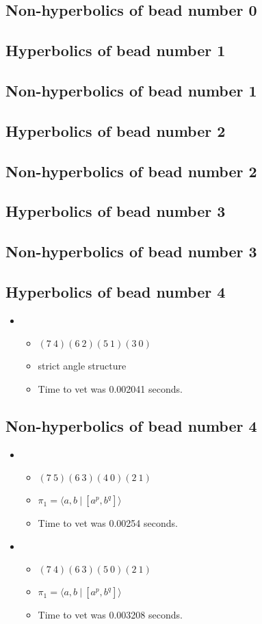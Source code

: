 \documentclass{article}
\begin{document}
\subsection{Non-hyperbolics of bead number 0}
\subsection{Hyperbolics of bead number 1}
\subsection{Non-hyperbolics of bead number 1}
\subsection{Hyperbolics of bead number 2}
\subsection{Non-hyperbolics of bead number 2}
\subsection{Hyperbolics of bead number 3}
\subsection{Non-hyperbolics of bead number 3}
\subsection{Hyperbolics of bead number 4}
\begin{itemize}
\item \begin{itemize}
      \item $(7\ 4)(6\ 2)(5\ 1)(3\ 0)$
      \item strict angle structure
      \item Time to vet was 0.002041 seconds.
\end{itemize}
\end{itemize}
\subsection{Non-hyperbolics of bead number 4}
\begin{itemize}
\item \begin{itemize}
      \item $(7\ 5)(6\ 3)(4\ 0)(2\ 1)$
      \item $\pi_1 = \langle a,b\ |\ [a^p,b^q]\rangle$
      \item Time to vet was 0.00254 seconds.
\end{itemize}
\item \begin{itemize}
      \item $(7\ 4)(6\ 3)(5\ 0)(2\ 1)$
      \item $\pi_1 = \langle a,b\ |\ [a^p,b^q]\rangle$
      \item Time to vet was 0.003208 seconds.
\end{itemize}
\end{itemize}
\end{document}
